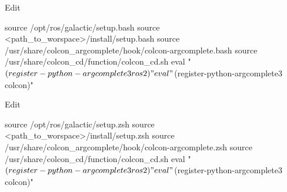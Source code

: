 \documentclass[usenames,11,dvipsnames,svgnames,x11names,aspectratio=1610,bibref]{beamer}
\renewcommand\sec{{\cnordSix{\secname}\hfill\mydisclaimer} }
\begin{document}
\begin{frame}[fragile]{\sec}
\vspace*{\fill}
\begin{center} 


\begin{compactitem}
\footnotesize
\item Edit 
    \begin{bashScriptListLine}
source /opt/ros/galactic/setup.bash
source <path_to_worspace>/install/setup.bash 
source /usr/share/colcon_argcomplete/hook/colcon-argcomplete.bash
source /usr/share/colcon_cd/function/colcon_cd.sh
eval "$(register-python-argcomplete3 ros2)"
eval "$(register-python-argcomplete3 colcon)"
    \end{bashScriptListLine}

\item Edit 
    \begin{bashScriptListLine}
source /opt/ros/galactic/setup.zsh
source <path_to_worspace>/install/setup.zsh 
source /usr/share/colcon_argcomplete/hook/colcon-argcomplete.zsh
source /usr/share/colcon_cd/function/colcon_cd.sh
eval "$(register-python-argcomplete3 ros2)"
eval "$(register-python-argcomplete3 colcon)"
    \end{bashScriptListLine}
    
\end{compactitem}

\end{center}
\vspace*{\fill}
\end{frame}


\end{document}

